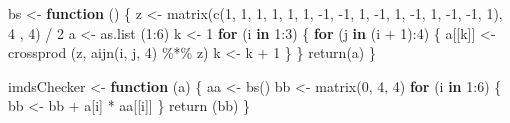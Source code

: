 \documentclass[
  12pt,
  letterpaper,
  DIV=11,
  numbers=noendperiod]{scrreprt}
\newenvironment{Shaded}{\begin{snugshade}}{\end{snugshade}}
\newcommand{\ControlFlowTok}[1]{\textcolor[rgb]{0.00,0.23,0.31}{\textbf{#1}}}
\newcommand{\DecValTok}[1]{\textcolor[rgb]{0.68,0.00,0.00}{#1}}
\newcommand{\FunctionTok}[1]{\textcolor[rgb]{0.28,0.35,0.67}{#1}}
\newcommand{\NormalTok}[1]{\textcolor[rgb]{0.00,0.23,0.31}{#1}}
\newcommand{\OtherTok}[1]{\textcolor[rgb]{0.00,0.23,0.31}{#1}}
\newcommand{\SpecialCharTok}[1]{\textcolor[rgb]{0.37,0.37,0.37}{#1}}
\theoremstyle{remark}
\begin{document}
\begin{Shaded}
\begin{Highlighting}[]
\NormalTok{bs }\OtherTok{\textless{}{-}} \ControlFlowTok{function}\NormalTok{ () \{}
\NormalTok{  z }\OtherTok{\textless{}{-}} \FunctionTok{matrix}\NormalTok{(}\FunctionTok{c}\NormalTok{(}\DecValTok{1}\NormalTok{, }\DecValTok{1}\NormalTok{, }\DecValTok{1}\NormalTok{, }\DecValTok{1}\NormalTok{, }\DecValTok{1}\NormalTok{, }\DecValTok{1}\NormalTok{, }\SpecialCharTok{{-}}\DecValTok{1}\NormalTok{, }\SpecialCharTok{{-}}\DecValTok{1}\NormalTok{, }\DecValTok{1}\NormalTok{, }\SpecialCharTok{{-}}\DecValTok{1}\NormalTok{, }\DecValTok{1}\NormalTok{, }\SpecialCharTok{{-}}\DecValTok{1}\NormalTok{, }\DecValTok{1}\NormalTok{, }\SpecialCharTok{{-}}\DecValTok{1}\NormalTok{, }\SpecialCharTok{{-}}\DecValTok{1}\NormalTok{, }\DecValTok{1}\NormalTok{), }\DecValTok{4}\NormalTok{ , }\DecValTok{4}\NormalTok{) }\SpecialCharTok{/} \DecValTok{2}
\NormalTok{  a }\OtherTok{\textless{}{-}} \FunctionTok{as.list}\NormalTok{ (}\DecValTok{1}\SpecialCharTok{:}\DecValTok{6}\NormalTok{)}
\NormalTok{  k }\OtherTok{\textless{}{-}} \DecValTok{1}
  \ControlFlowTok{for}\NormalTok{ (i }\ControlFlowTok{in} \DecValTok{1}\SpecialCharTok{:}\DecValTok{3}\NormalTok{) \{}
    \ControlFlowTok{for}\NormalTok{ (j }\ControlFlowTok{in}\NormalTok{ (i }\SpecialCharTok{+} \DecValTok{1}\NormalTok{)}\SpecialCharTok{:}\DecValTok{4}\NormalTok{) \{}
\NormalTok{      a[[k]] }\OtherTok{\textless{}{-}} \FunctionTok{crossprod}\NormalTok{ (z, }\FunctionTok{aijn}\NormalTok{(i, j, }\DecValTok{4}\NormalTok{) }\SpecialCharTok{\%*\%}\NormalTok{ z)}
\NormalTok{      k }\OtherTok{\textless{}{-}}\NormalTok{ k }\SpecialCharTok{+} \DecValTok{1}
\NormalTok{    \}}
\NormalTok{  \}}
  \FunctionTok{return}\NormalTok{(a)}
\NormalTok{\}}

\NormalTok{imdsChecker }\OtherTok{\textless{}{-}} \ControlFlowTok{function}\NormalTok{ (a) \{}
\NormalTok{  aa }\OtherTok{\textless{}{-}} \FunctionTok{bs}\NormalTok{()}
\NormalTok{  bb }\OtherTok{\textless{}{-}} \FunctionTok{matrix}\NormalTok{(}\DecValTok{0}\NormalTok{, }\DecValTok{4}\NormalTok{, }\DecValTok{4}\NormalTok{)}
  \ControlFlowTok{for}\NormalTok{ (i }\ControlFlowTok{in} \DecValTok{1}\SpecialCharTok{:}\DecValTok{6}\NormalTok{) \{}
\NormalTok{    bb }\OtherTok{\textless{}{-}}\NormalTok{ bb }\SpecialCharTok{+}\NormalTok{ a[i] }\SpecialCharTok{*}\NormalTok{ aa[[i]]}
\NormalTok{  \}}
  \FunctionTok{return}\NormalTok{ (bb)}
\NormalTok{\}}


\end{Highlighting}
\end{Shaded}
\end{document}

